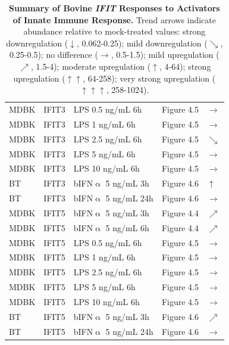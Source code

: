 \begin{table}
\begin{tabular}{lllll}
        MDBK & IFIT3 & LPS 0.5 ng/mL 6h & Figure 4.5 & \(\rightarrow\) \\ 
        MDBK & IFIT3 & LPS 1 ng/mL 6h & Figure 4.5 & \(\rightarrow\) \\ 
        MDBK & IFIT3 & LPS 2.5 ng/mL 6h & Figure 4.5 & \(\searrow\) \\ 
        MDBK & IFIT3 & LPS 5 ng/mL 6h & Figure 4.5 & \(\rightarrow\) \\ 
        MDBK & IFIT3 & LPS 10 ng/mL 6h & Figure 4.5 & \(\rightarrow\) \\ 
        BT & IFIT3 & bIFN$\upalpha$ 5 ng/mL 3h & Figure 4.6 & \(\uparrow\) \\ 
        BT & IFIT3 & bIFN$\upalpha$ 5 ng/mL 24h & Figure 4.6 & \(\rightarrow\) \\ 
        MDBK & IFIT5 & bIFN$\upalpha$ 5 ng/mL 3h & Figure 4.4 & \(\nearrow\) \\ 
        MDBK & IFIT5 & bIFN$\upalpha$ 5 ng/mL 6h & Figure 4.4 & \(\nearrow\) \\ 
        MDBK & IFIT5 & LPS 0.5 ng/mL 6h & Figure 4.5 & \(\rightarrow\) \\ 
        MDBK & IFIT5 & LPS 1 ng/mL 6h & Figure 4.5 & \(\rightarrow\) \\ 
        MDBK & IFIT5 & LPS 2.5 ng/mL 6h & Figure 4.5 & \(\rightarrow\) \\ 
        MDBK & IFIT5 & LPS 5 ng/mL 6h & Figure 4.5 & \(\rightarrow\) \\ 
        MDBK & IFIT5 & LPS 10 ng/mL 6h & Figure 4.5 & \(\rightarrow\) \\ 
        BT & IFIT5 & bIFN$\upalpha$ 5 ng/mL 3h & Figure 4.6 & \(\nearrow\) \\ 
        BT & IFIT5 & bIFN$\upalpha$ 5 ng/mL 24h & Figure 4.6 & \(\rightarrow\) \\ \hline
    \end{tabular}
	\caption[Summary of Bovine \textit{IFIT} Responses to Activators of Innate Immune Response.]{\textbf{Summary of Bovine \textit{IFIT} Responses to Activators of Innate Immune Response.} Trend arrows indicate abundance relative to mock-treated values: strong downregulation ($\downarrow$, 0.062-0.25); mild downregulation ($\searrow$, 0.25-0.5); no difference ($\rightarrow$, 0.5-1.5); mild upregulation ($\nearrow$, 1.5-4); moderate upregulation ($\uparrow$, 4-64); strong upregulation ($\uparrow\uparrow$, 64-258); very strong upregulation ($\uparrow\uparrow\uparrow$, 258-1024).}
    \label{tab:Summary of Bovine IFIT Responses to Activators of Innate Immune Response.}
\end{table}

